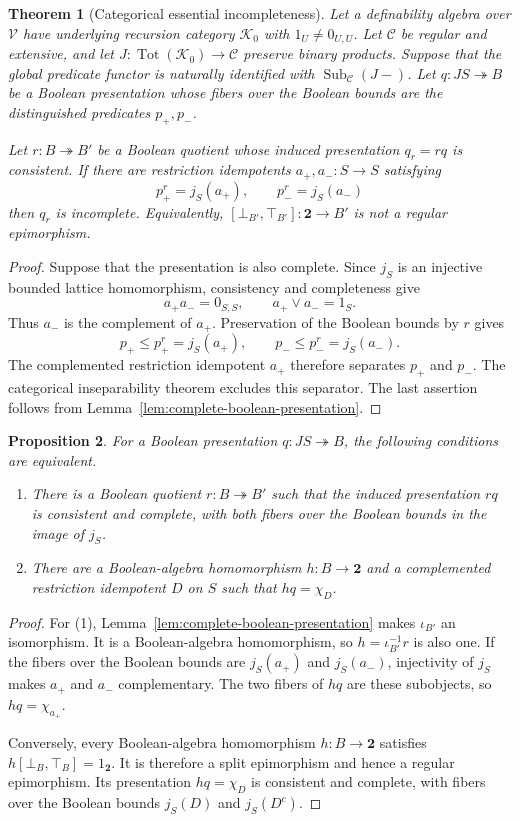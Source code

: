 \documentclass[11pt]{article}
\newtheorem{theorem}{Theorem}[section]
\newtheorem{proposition}[theorem]{Proposition}
\theoremstyle{definition}
\theoremstyle{remark}
\begin{document}
\begin{theorem}[Categorical essential incompleteness]
\label{thm:categorical-essential-incompleteness}
Let a definability algebra over $\mathscr V$ have underlying
recursion category $\mathcal K_0$ with $1_U\ne0_{U,U}$.
Let $\mathcal C$ be regular and extensive, and let
$J:\operatorname{Tot}(\mathcal K_0)\to\mathcal C$ preserve binary
products. Suppose that the global predicate functor is naturally
identified with $\operatorname{Sub}_{\mathcal C}(J{-})$.
Let $q:JS\twoheadrightarrow B$ be a Boolean presentation whose
fibers over the Boolean bounds are the distinguished predicates $p_+,p_-$.

Let $r:B\twoheadrightarrow B'$ be a Boolean quotient whose
induced presentation $q_r=rq$ is consistent. If there are
restriction idempotents $a_+,a_-:S\to S$ satisfying
\[
 p^r_+=j_S(a_+),\qquad p^r_-=j_S(a_-)
\]
then $q_r$ is incomplete. Equivalently,
$[\bot_{B'},\top_{B'}]:\mathbf2\to B'$ is not a regular
epimorphism.
\end{theorem}
\begin{proof}
Suppose that the presentation is also complete. Since $j_S$ is an
injective bounded lattice homomorphism, consistency and
completeness give
\[
 a_+a_-=0_{S,S},\qquad a_+\vee a_-=1_S.
\]
Thus $a_-$ is the complement of $a_+$. Preservation of the Boolean
bounds by $r$ gives
\[
 p_+\leq p^r_+=j_S(a_+),\qquad
 p_-\leq p^r_-=j_S(a_-).
\]
The complemented restriction idempotent $a_+$ therefore separates $p_+$ and
$p_-$. The categorical inseparability theorem excludes this
separator. The last assertion follows from
Lemma~\ref{lem:complete-boolean-presentation}.
\end{proof}

\begin{proposition}\label{prop:complete-extensions-and-decisions}
For a Boolean presentation $q:JS\twoheadrightarrow B$, the
following conditions are equivalent.
\begin{enumerate}
\item There is a Boolean quotient $r:B\twoheadrightarrow B'$
such that the induced presentation $rq$ is consistent and complete,
with both fibers over the Boolean bounds in the image of $j_S$.
\item There are a Boolean-algebra homomorphism
$h:B\to\mathbf2$ and a complemented restriction idempotent $D$ on
$S$ such that $hq=\chi_D$.
\end{enumerate}
\end{proposition}
\begin{proof}
For (1), Lemma~\ref{lem:complete-boolean-presentation} makes
$\iota_{B'}$ an isomorphism. It is a Boolean-algebra homomorphism,
so $h=\iota_{B'}^{-1}r$ is also one. If the fibers over the Boolean bounds are
$j_S(a_+)$ and $j_S(a_-)$, injectivity of $j_S$ makes $a_+$ and
$a_-$ complementary. The two fibers of $hq$ are these subobjects,
so $hq=\chi_{a_+}$.

Conversely, every Boolean-algebra homomorphism
$h:B\to\mathbf2$ satisfies $h[\bot_B,\top_B]=1_{\mathbf2}$.
It is therefore a split epimorphism and hence a regular
epimorphism. Its presentation $hq=\chi_D$ is consistent and
complete, with fibers over the Boolean bounds $j_S(D)$ and $j_S(D^c)$.
\end{proof}
\end{document}
